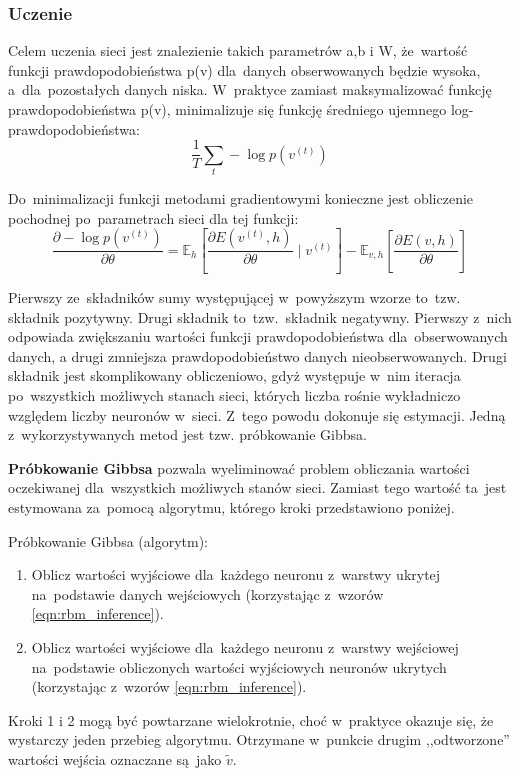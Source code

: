 \subsubsection{Uczenie}
Celem uczenia sieci jest znalezienie takich parametrów a,b i W, że~wartość funkcji prawdopodobieństwa p(v)
dla~danych obserwowanych będzie wysoka, a~dla~pozostałych danych niska. W~praktyce zamiast maksymalizować
funkcję prawdopodobieństwa p(v), minimalizuje się funkcję średniego ujemnego log-prawdopodobieństwa:
$$\frac{1}{T}\sum\limits_{t}-\log{p(v^{(t)})}$$

Do~minimalizacji funkcji metodami gradientowymi konieczne jest obliczenie pochodnej po~parametrach sieci
dla tej funkcji:
$$\frac{\partial-\log{p(v^{(t)})}}{\partial{\theta}}=\mathbb{E}_h[\frac{\partial{E(v^{(t)},h)}}{\partial{\theta}}\mid{v^{(t)}}]-\mathbb{E}_{v,h}[\frac{\partial{E(v,h)}}{\partial{\theta}}]$$

Pierwszy ze~składników sumy występującej w~powyższym wzorze to~tzw. składnik pozytywny. Drugi składnik
to~tzw.~składnik negatywny. Pierwszy z~nich odpowiada zwiększaniu wartości funkcji prawdopodobieństwa
dla~obserwowanych danych, a drugi zmniejsza prawdopodobieństwo danych nieobserwowanych. Drugi składnik jest
skomplikowany obliczeniowo, gdyż występuje w~nim iteracja po~wszystkich możliwych stanach sieci, których
liczba rośnie wykładniczo względem liczby neuronów w~sieci. Z~tego powodu dokonuje się estymacji. Jedną
z~wykorzystywanych metod jest tzw. próbkowanie Gibbsa. 

\textbf{Próbkowanie Gibbsa} pozwala wyeliminować problem obliczania wartości oczekiwanej dla~wszystkich
możliwych stanów sieci. Zamiast tego wartość ta~jest estymowana za~pomocą algorytmu, którego kroki
przedstawiono poniżej.

Próbkowanie Gibbsa (algorytm):
\begin{enumerate}
  \item Oblicz wartości wyjściowe dla~każdego neuronu z~warstwy ukrytej na~podstawie danych wejściowych
  (korzystając z~wzorów \ref{eqn:rbm_inference}).
  \item Oblicz wartości wyjściowe dla~każdego neuronu z~warstwy wejściowej na~podstawie obliczonych wartości
  wyjściowych neuronów ukrytych (korzystając z~wzorów \ref{eqn:rbm_inference}).
\end{enumerate}

Kroki 1 i 2 mogą być powtarzane wielokrotnie, choć w~praktyce okazuje się, że wystarczy jeden
przebieg algorytmu. Otrzymane w~punkcie drugim ,,odtworzone'' wartości wejścia oznaczane są~jako $\tilde{v}$.

